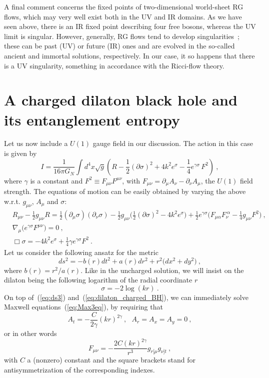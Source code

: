 \documentclass[a4paper, 12pt]{article}
\def\f{\frac}
\def\g{\gamma}
\def\p{\partial}
\def\s{\sigma}
\def\be{\begin{equation}}
\def\ee{\end{equation}}
\def\bea{\begin{eqnarray}}
\def\eea{\end{eqnarray}}
\begin{document}
 A final comment concerns the fixed points of two-dimensional world-sheet RG flows, which may very well exist both in the UV and IR domains. As we have seen above, there is an IR fixed point describing four free bosons, whereas the UV limit is singular.  However, generally,  RG flows tend to develop singularities~\cite{Chow}; these  can be past (UV) or future (IR) ones and are evolved in the so-called ancient and immortal solutions, respectively. In our case, it so happens that there is a UV singularity, something in accordance with the Ricci-flow theory. 









\section{A charged dilaton black hole and its entanglement entropy}
\label{sec:charged}


Let us now include a $U(1)$ gauge field in our discussion. The action in this case is given by 
\be 
I=\frac{1}{16\pi G_N}\int d^4x \sqrt g\left(R-\f{1}{2}(\p \s)^2+4k^2e^\s-\f{1}{4}e^{\gamma \s}\,F^2\right) \ ,
\ee
where $\gamma$ is a constant and $F^2\equiv F_{\mu\nu}F^{\mu\nu}$, with  $F_{\mu\nu}=\p_{\mu}A_{\nu}-\p_{\nu}A_{\mu}$, the $U(1)$ field strength.
The equations of motion can be easily obtained by varying the above w.r.t. $g_{\mu\nu}$, $A_\mu$ and $\s$:
\bea
& R_{\mu\nu}-\frac{1}{2}g_{\mu\nu}R=\frac{1}{2}(\p_\mu \s)(\p_\nu \s)-\frac{1}{2}g_{\mu\nu}\Bigg(\frac{1}{2}(\p \s)^2-4k^2e^\s\Bigg)+\frac{1}{2}e^{\gamma\s}\Bigg(F_{\mu\alpha}F_\nu^{~\alpha}
-\f{1}{4}g_{\mu\nu}F^2\Bigg) \ ,&\\
& \nabla_\mu\Big(e^{\gamma \s}F^{\mu\nu}\Big) = 0 \ ,& \label{eq:Max3eq}\\
& \Box \s=-4k^2e^\s+\f{1}{4}\gamma e^{\gamma \s} F^2 \ .&\label{eq:S3eq}
\eea
Let us consider the following ansatz for the metric 
\be
\label{eq:ds3}
ds^2=-b(r)dt^2+a(r) dr^2+r^{2}\Big(dx^2+dy^2\Big)
 \ ,
\ee
where $b(r) =r^2/a(r) $. Like in the uncharged solution, we will insist on the dilaton being the following logarithm of the radial coordinate $r$
\be
\label{eq:dilaton_charged_BH}
\s = -2 \log (k r) \ .
\ee
On top of~(\ref{eq:ds3}) and~(\ref{eq:dilaton_charged_BH}), we can immediately solve Maxwell equations~(\ref{eq:Max3eq}), by requiring that 
\be
A_t = - \frac{C}{2\g} (k r)^{2\gamma} \ ,~~~A_r=A_x=A_y= 0 \ ,
\ee
or in other words
\be 
\label{eq:Max3sol}
F_{\mu\nu}=-
\f{2C (k r)^{2\gamma}}{r^3}g_{r[\mu}g_{\nu]t} \ ,
\ee
with $C$ a (nonzero) constant and the square brackets stand for antisymmetrization of the corresponding indexes. 
\end{document}
